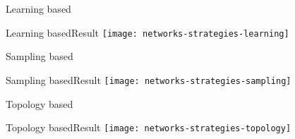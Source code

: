 
\begin{frame}{Learning based}

\end{frame}

\begin{frame}{Learning based}{Result}
	\centering
	\texttt{[image: networks-strategies-learning]}
\end{frame}

\begin{frame}{Sampling based}

\end{frame}

\begin{frame}{Sampling based}{Result}
	\centering
	\texttt{[image: networks-strategies-sampling]}
\end{frame}

\begin{frame}{Topology based}

\end{frame}

\begin{frame}{Topology based}{Result}
	\centering
	\texttt{[image: networks-strategies-topology]}
\end{frame}

